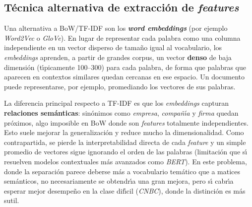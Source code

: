 \documentclass[11pt,a4paper]{article}
\begin{document}
\subsection{T\'{e}cnica alternativa de extracci\'{o}n de \textit{features}}

Una alternativa a BoW/TF-IDF son los \textbf{\textit{word embeddings}} (por ejemplo \textit{Word2Vec} o \textit{GloVe}). En lugar de representar cada palabra como una columna independiente en un vector disperso de tama\~{n}o igual al vocabulario, los \textit{embeddings} aprenden, a partir de grandes corpus, un vector \textbf{denso} de baja dimensi\'{o}n (t\'{\i}picamente 100--300) para cada palabra, de forma que palabras que aparecen en contextos similares quedan cercanas en ese espacio. Un documento puede representarse, por ejemplo, promediando los vectores de sus palabras.

La diferencia principal respecto a TF-IDF es que los \textit{embeddings} capturan \textbf{relaciones sem\'{a}nticas}: sin\'{o}nimos como \textit{empresa}, \textit{compa\~{n}\'{\i}a} y \textit{firma} quedan pr\'{o}ximos, algo imposible en BoW donde son \textit{features} totalmente independientes. Esto suele mejorar la generalizaci\'{o}n y reduce mucho la dimensionalidad. Como contrapartida, se pierde la interpretabilidad directa de cada \textit{feature} y un simple promedio de vectores sigue ignorando el orden de las palabras (limitaci\'{o}n que s\'{\i} resuelven modelos contextuales m\'{a}s avanzados como \textit{BERT}). En este problema, donde la separaci\'{o}n parece deberse m\'{a}s a vocabulario tem\'{a}tico que a matices sem\'{a}nticos, no necesariamente se obtendr\'{\i}a una gran mejora, pero s\'{\i} cabr\'{\i}a esperar mejor desempe\~{n}o en la clase dif\'{\i}cil (\textit{CNBC}), donde la distinci\'{o}n es m\'{a}s sutil.
\end{document}
